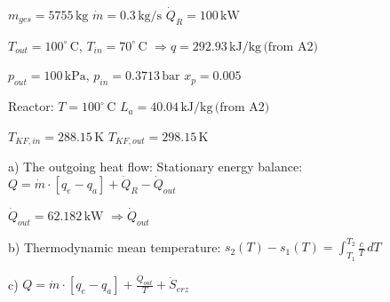 \( m_{ges} = 5755 \, \text{kg} \)  
\( \dot{m} = 0.3 \, \text{kg/s} \)  
\( \dot{Q}_R = 100 \, \text{kW} \)  

\( T_{out} = 100^\circ \, \text{C} \), \( T_{in} = 70^\circ \, \text{C} \)  
\( \Rightarrow q = 292.93 \, \text{kJ/kg} \, \text{(from A2)} \)  

\( p_{out} = 100 \, \text{kPa}, \, p_{in} = 0.3713 \, \text{bar} \)  
\( x_p = 0.005 \)  

Reactor: \( T = 100^\circ \, \text{C} \)  
\( L_a = 40.04 \, \text{kJ/kg} \, \text{(from A2)} \)  

\( T_{KF,in} = 288.15 \, \text{K} \)  
\( T_{KF,out} = 298.15 \, \text{K} \)  

a) The outgoing heat flow:  
Stationary energy balance:  
\( Q = \dot{m} \cdot [q_{e} - q_{a}] + \dot{Q}_R - \dot{Q}_{out} \)  

\( \dot{Q}_{out} = 62.182 \, \text{kW} \)  
\( \Rightarrow \dot{Q}_{out} \)  

b) Thermodynamic mean temperature:  
\( s_2(T) - s_1(T) = \int_{T_1}^{T_2} \frac{c}{T} \, dT \)  

c) \( Q = \dot{m} \cdot [q_{e} - q_{a}] + \frac{\dot{Q}_{out}}{T} + \dot{S}_{erz} \)